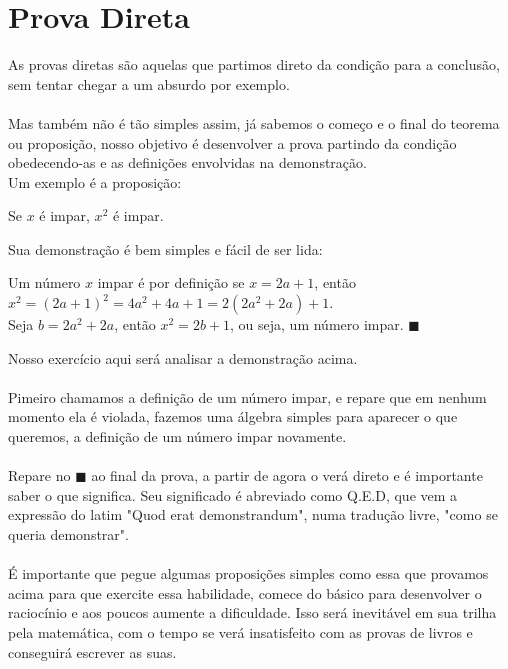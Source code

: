 \documentclass[main.tex]{subfiles}
\begin{document}
\section{Prova Direta}
As provas diretas são aquelas que partimos direto da condição para a conclusão, sem tentar chegar a um absurdo por exemplo.
\\
\\
Mas também não é tão simples assim, já sabemos o começo e o final do teorema ou proposição, nosso objetivo é desenvolver a prova partindo da condição obedecendo-as e as definições envolvidas na demonstração.
\\
Um exemplo é a proposição:
\begin{proposition}
Se $x$ é impar, $x^2$ é impar.
\end{proposition}
Sua demonstração é bem simples e fácil de ser lida:
\begin{demonstration}
Um número $x$ impar é por definição se $x=2a+1$, então $x^2 = (2a+1)^2 = 4a^2 + 4a +1 = 2(2a^2 + 2a) +1$.\\
Seja $b=2a^2 + 2a$, então $x^2 = 2b+1$, ou seja, um número impar. $\blacksquare$
\end{demonstration}
Nosso exercício aqui será analisar a demonstração acima.
\\
\\
Pimeiro chamamos a definição de um número impar, e repare que em nenhum momento ela é violada, fazemos uma álgebra simples para aparecer o que queremos, a definição de um número impar novamente.
\\
\\
Repare no $\blacksquare$ ao final da prova, a partir de agora o verá direto e é importante saber o que significa. Seu significado é abreviado como Q.E.D, que vem a expressão do latim "Quod erat demonstrandum", numa tradução livre, "como se queria demonstrar".
\\
\\
É importante que pegue algumas proposições simples como essa que provamos acima para que exercite essa habilidade, comece do básico para desenvolver o raciocínio e aos poucos aumente a dificuldade. Isso será inevitável em sua trilha pela matemática, com o tempo se verá insatisfeito com as provas de livros e conseguirá escrever as suas.
\end{document}
